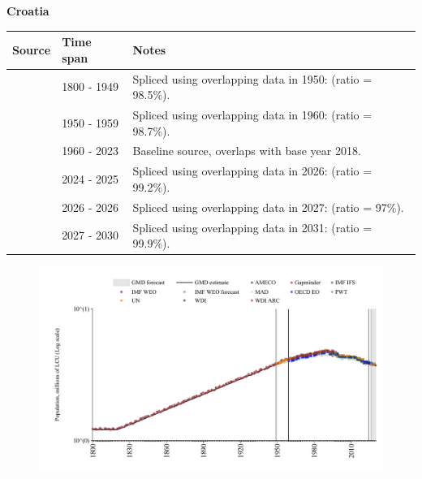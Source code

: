 \documentclass[12pt,a4paper,landscape]{article}
\begin{document}
\begin{adjustbox}{max totalsize={\paperwidth}{\paperheight},center}
\begin{minipage}[t][\textheight][t]{\textwidth}
\vspace*{0.5cm}
{}
\begin{center}
{\Large\bfseries Croatia}
\end{center}
\vspace{0.5cm}
\begin{table}[H]
\centering
\small
\begin{tabular}{|l|l|l|}
\hline
\textbf{Source} & \textbf{Time span} & \textbf{Notes} \\
\hline
\rowcolor{white}\cite{Gapminder}& 1800 - 1949 &Spliced using overlapping data in 1950: (ratio = 98.5\%).\\
\rowcolor{lightgray}\cite{IMF_IFS}& 1950 - 1959 &Spliced using overlapping data in 1960: (ratio = 98.7\%).\\
\rowcolor{white}\cite{WDI}& 1960 - 2023 &Baseline source, overlaps with base year 2018.\\
\rowcolor{lightgray}\cite{OECD_EO}& 2024 - 2025 &Spliced using overlapping data in 2026: (ratio = 99.2\%).\\
\rowcolor{white}\cite{AMECO}& 2026 - 2026 &Spliced using overlapping data in 2027: (ratio = 97\%).\\
\rowcolor{lightgray}\cite{Gapminder}& 2027 - 2030 &Spliced using overlapping data in 2031: (ratio = 99.9\%).\\
\hline
\end{tabular}
\end{table}
\begin{figure}[H]
\centering
\includegraphics[width=\textwidth,height=0.6\textheight,keepaspectratio]{graphs/HRV_pop.pdf}
\end{figure}
\end{minipage}
\end{adjustbox}
\end{document}
